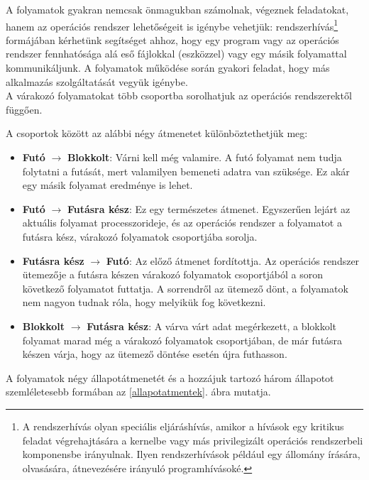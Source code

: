 \documentclass[tikz,12pt,margin=0px]{article}
\begin{document}
    \noindent A folyamatok gyakran nemcsak önmagukban számolnak, végeznek feladatokat, hanem az operációs rendszer lehetőségeit is igénybe vehetjük: rendszerhívás\footnote{A rendszerhívás olyan speciális eljáráshívás, amikor a hívások egy kritikus feladat végrehajtására a kernelbe vagy más privilegizált operációs rendszerbeli komponensbe irányulnak. Ilyen rendszerhívások például egy állomány írására, olvasására, átnevezésére irányuló programhívásoké.} formájában kérhetünk segítséget ahhoz, hogy egy program vagy az operációs rendszer fennhatósága alá eső fájlokkal (eszközzel) vagy egy másik folyamattal kommunikáljunk. A folyamatok működése során gyakori feladat, hogy más alkalmazás szolgáltatását vegyük igénybe.\\

    \noindent A várakozó folyamatokat több csoportba sorolhatjuk az operációs rendszerektől függően. 

    \noindent A csoportok között az alábbi négy átmenetet különböztethetjük meg:

    \begin{itemize}[topsep=8pt,itemsep=4pt,partopsep=4pt, parsep=4pt]
        \item \textbf{Futó} $\rightarrow$ \textbf{Blokkolt}: {\small Várni kell még valamire. A futó folyamat nem tudja folytatni a futását, mert valamilyen bemeneti adatra van szüksége. Ez akár egy másik folyamat eredménye is lehet.}
        \item \textbf{Futó} $\rightarrow$ \textbf{Futásra kész}: {\small Ez egy természetes átmenet. Egyszerűen lejárt az aktuális folyamat processzorideje, és az operációs rendszer a folyamatot a futásra kész, várakozó folyamatok csoportjába sorolja.}
        \item \textbf{Futásra kész} $\rightarrow$ \textbf{Futó}: {\small Az előző átmenet fordítottja. Az operációs rendszer ütemezője a futásra készen várakozó folyamatok csoportjából a soron következő folyamatot futtatja. A sorrendről az ütemező dönt, a folyamatok nem nagyon tudnak róla, hogy melyikük fog következni.}
        \item \textbf{Blokkolt} $\rightarrow$ \textbf{Futásra kész}: {\small A várva várt adat megérkezett, a blokkolt folyamat marad még a várakozó folyamatok csoportjában, de már futásra készen várja, hogy az ütemező döntése esetén újra futhasson.}
    \end{itemize}

    \noindent A folyamatok négy állapotátmenetét és a hozzájuk tartozó három állapotot szemléletesebb formában az \ref{allapotatmentek}. ábra mutatja.
\end{document}
